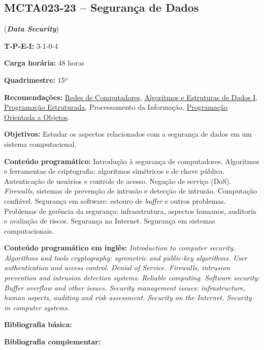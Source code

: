 \documentclass[12pt,a4paper]{article}
\begin{document}
\subsection{MCTA023-23 -- Segurança de Dados}
\label{disc:seg}

(\textbf{\textit{Data Security}})

\begin{center}
    \begin{minipage}{0.85\textwidth}
    
        \textbf{T-P-E-I:} 3-1-0-4
        
        \textbf{Carga horária:} 48 horas
        
        \textbf{Quadrimestre:} 15º
        
        \textbf{Recomendações:} 
        \hyperref[disc:redes]{Redes de Computadores},
        \hyperref[disc:aedI]{Algoritmos e Estruturas de Dados I},
        \hyperref[disc:pe]{Programação Estruturada},
        Processamento da Informação,
        \hyperref[disc:poo]{Programação Orientada a Objetos}.
        
    \end{minipage}
\end{center}

\textbf{Objetivos:}
Estudar os aspectos relacionados com a segurança de dados em um sistema
computacional.

\textbf{Conteúdo programático:}
Introdução à segurança de computadores.
Algoritmos e ferramentas de criptografia: algoritmos simétricos e de chave pública.
Autenticação de usuários e controle de acesso.
Negação de serviço (DoS).
\textit{Firewalls}, sistemas de prevenção de intrusão e detecção de intrusão.
Computação confiável.
Segurança em software: estouro de \textit{buffer} e outros problemas.
Problemas de gerência da segurança: infraestrutura, aspectos humanos, auditoria
e avaliação de riscos. 
Segurança na Internet. Segurança em sistemas computacionais.

\textbf{Conteúdo programático em inglês:}
\textit{Introduction to computer security. 
Algorithms and tools cryptography: symmetric and public-key algorithms. 
User authentication and access control.
Denial of Service. 
Firewalls, intrusion prevention and intrusion detection systems. 
Reliable computing. 
Software security: Buffer overflow and other issues. 
Security management issues: infrastructure, human aspects, auditing and risk assessment. 
Security on the Internet. Security in computer systems.}

\newrefsection
\textbf{Bibliografia básica:}
\nocite{2013-goodrich-tamassia, 2008-stallings, 2007-nakamura-geus} 
\printbibliography

\newrefsection
\textbf{Bibliografia complementar:}
\nocite{2007-konheim, 1996-schneier, 2011-stamp, 2017-correia-sousa, 2005-cheswick-etal}
\printbibliography
\end{document}
